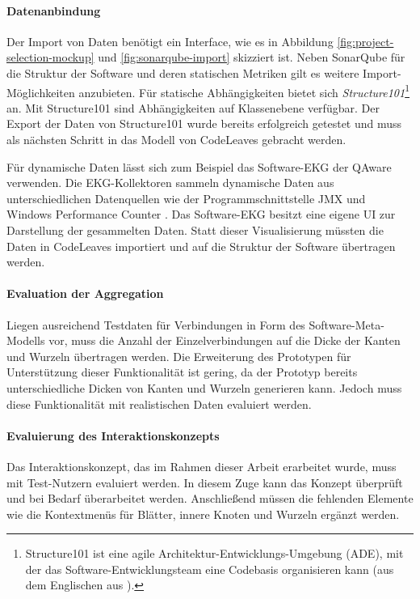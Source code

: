 \paragraph{Datenanbindung}

Der Import von Daten benötigt ein Interface, wie es in Abbildung \ref{fig:project-selection-mockup} und \ref{fig:sonarqube-import} skizziert ist. Neben SonarQube für die Struktur der Software und deren statischen Metriken gilt es weitere Import-Möglichkeiten anzubieten. Für statische Abhängigkeiten bietet sich \textit{Structure101}\footnote{Structure101 ist eine agile Architektur-Entwicklungs-Umgebung (ADE), mit der das Software-Entwicklungsteam eine Codebasis organisieren kann (aus dem Englischen aus \cite{headway2017structure101}).} an. Mit Structure101 sind Abhängigkeiten auf Klassenebene verfügbar. Der Export der Daten von Structure101 wurde bereits erfolgreich getestet und muss als nächsten Schritt in das Modell von CodeLeaves gebracht werden.

Für dynamische Daten lässt sich zum Beispiel das Software-EKG der QAware verwenden. Die EKG-Kollektoren sammeln dynamische Daten aus unterschiedlichen Datenquellen wie der Programmschnittstelle JMX und Windows Performance Counter \cite{weigend2011dynamische}. Das Software-EKG besitzt eine eigene UI zur Darstellung der gesammelten Daten. Statt dieser Visualisierung müssten die Daten in CodeLeaves importiert und auf die Struktur der Software übertragen werden.

\paragraph{Evaluation der Aggregation}

Liegen ausreichend Testdaten für Verbindungen in Form des Software-Meta-Modells vor, muss die Anzahl der Einzelverbindungen auf die Dicke der Kanten und Wurzeln übertragen werden. Die Erweiterung des Prototypen für Unterstützung dieser Funktionalität ist gering, da der Prototyp bereits unterschiedliche Dicken von Kanten und Wurzeln generieren kann. Jedoch muss diese Funktionalität mit realistischen Daten evaluiert werden.

\paragraph{Evaluierung des Interaktionskonzepts}

Das Interaktionskonzept, das im Rahmen dieser Arbeit erarbeitet wurde, muss mit Test-Nutzern evaluiert werden. In diesem Zuge kann das Konzept überprüft und bei Bedarf überarbeitet werden. Anschließend müssen die fehlenden Elemente wie die Kontextmenüs für Blätter, innere Knoten und Wurzeln ergänzt werden.\\

